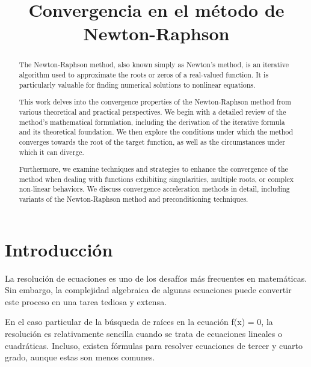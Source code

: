\documentclass[conference]{IEEEtran}
\begin{document}
\title{Convergencia en el método de Newton-Raphson\\}

\author{
	}

\maketitle



\begin{abstract}
The Newton-Raphson method, also known simply as Newton's method, is an iterative algorithm used to approximate the roots or zeros of a real-valued function. It is particularly valuable for finding numerical solutions to nonlinear equations.

This work delves into the convergence properties of the Newton-Raphson method from various theoretical and practical perspectives. We begin with a detailed review of the method's mathematical formulation, including the derivation of the iterative formula and its theoretical foundation. We then explore the conditions under which the method converges towards the root of the target function, as well as the circumstances under which it can diverge.

Furthermore, we examine techniques and strategies to enhance the convergence of the method when dealing with functions exhibiting singularities, multiple roots, or complex non-linear behaviors. We discuss convergence acceleration methods in detail, including variants of the Newton-Raphson method and preconditioning techniques.

\end{abstract}

\section{Introducción}
La resolución de ecuaciones es uno de los desafíos más frecuentes en matemáticas. Sin embargo, la complejidad algebraica de algunas ecuaciones puede convertir este proceso en una tarea tediosa y extensa.

En el caso particular de la búsqueda de raíces en la ecuación f(x) = 0, la resolución es relativamente sencilla cuando se trata de ecuaciones lineales o cuadráticas. Incluso, existen fórmulas para resolver ecuaciones de tercer y cuarto grado, aunque estas son menos comunes.
\end{document}
